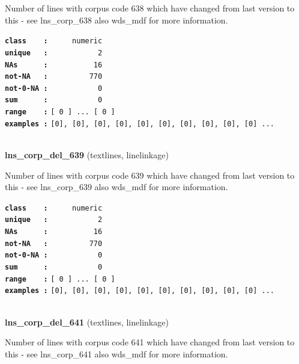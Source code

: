 \documentclass[]{article}
\begin{document}
Number of lines with corpus code 638 which have changed from last
version to this - see lns\_corp\_638 also wds\_mdf for more information.

\textbf{\texttt{class\ \ \ \ :}} \texttt{~~~~~numeric}\\
\textbf{\texttt{unique\ \ \ :}} \texttt{~~~~~~~~~~~2}\\
\textbf{\texttt{NAs\ \ \ \ \ \ :}} \texttt{~~~~~~~~~~16}\\
\textbf{\texttt{not-NA\ \ \ :}} \texttt{~~~~~~~~~770}\\
\textbf{\texttt{not-0-NA\ :}} \texttt{~~~~~~~~~~~0}\\
\textbf{\texttt{sum\ \ \ \ \ \ :}} \texttt{~~~~~~~~~~~0}\\
\textbf{\texttt{range\ \ \ \ :}}
\texttt{{[}\ 0\ {]}\ ...\ {[}\ 0\ {]}}\\
\textbf{\texttt{examples\ :}}
\texttt{{[}0{]},\ {[}0{]},\ {[}0{]},\ {[}0{]},\ {[}0{]},\ {[}0{]},\ {[}0{]},\ {[}0{]},\ {[}0{]},\ {[}0{]}\ ...}\\

~

\textbf{lns\_corp\_del\_639} (textlines, linelinkage)

Number of lines with corpus code 639 which have changed from last
version to this - see lns\_corp\_639 also wds\_mdf for more information.

\textbf{\texttt{class\ \ \ \ :}} \texttt{~~~~~numeric}\\
\textbf{\texttt{unique\ \ \ :}} \texttt{~~~~~~~~~~~2}\\
\textbf{\texttt{NAs\ \ \ \ \ \ :}} \texttt{~~~~~~~~~~16}\\
\textbf{\texttt{not-NA\ \ \ :}} \texttt{~~~~~~~~~770}\\
\textbf{\texttt{not-0-NA\ :}} \texttt{~~~~~~~~~~~0}\\
\textbf{\texttt{sum\ \ \ \ \ \ :}} \texttt{~~~~~~~~~~~0}\\
\textbf{\texttt{range\ \ \ \ :}}
\texttt{{[}\ 0\ {]}\ ...\ {[}\ 0\ {]}}\\
\textbf{\texttt{examples\ :}}
\texttt{{[}0{]},\ {[}0{]},\ {[}0{]},\ {[}0{]},\ {[}0{]},\ {[}0{]},\ {[}0{]},\ {[}0{]},\ {[}0{]},\ {[}0{]}\ ...}\\

~

\textbf{lns\_corp\_del\_641} (textlines, linelinkage)

Number of lines with corpus code 641 which have changed from last
version to this - see lns\_corp\_641 also wds\_mdf for more information.
\end{document}

